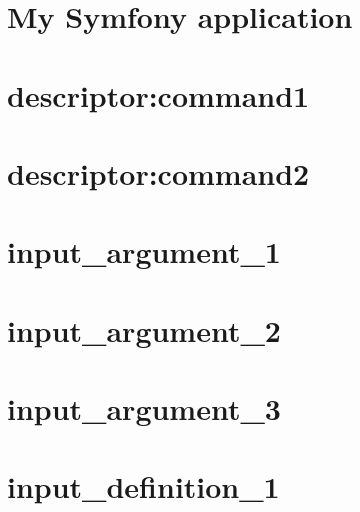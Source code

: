 \documentclass[twoside]{book}
\newcommand{\+}{\discretionary{\mbox{\scriptsize$\hookleftarrow$}}{}{}}
\begin{document}
\chapter{My Symfony application}
\label{md_vendor_symfony_console__symfony__component__console__tests__fixtures_application_2}

\chapter{descriptor\+:command1}
\label{md_vendor_symfony_console__symfony__component__console__tests__fixtures_command_1}

\chapter{descriptor\+:command2}
\label{md_vendor_symfony_console__symfony__component__console__tests__fixtures_command_2}

\chapter{input\+\_\+argument\+\_\+1}
\label{md_vendor_symfony_console__symfony__component__console__tests__fixtures_input_argument_1}

\chapter{input\+\_\+argument\+\_\+2}
\label{md_vendor_symfony_console__symfony__component__console__tests__fixtures_input_argument_2}

\chapter{input\+\_\+argument\+\_\+3}
\label{md_vendor_symfony_console__symfony__component__console__tests__fixtures_input_argument_3}

\chapter{input\+\_\+definition\+\_\+1}
\label{md_vendor_symfony_console__symfony__component__console__tests__fixtures_input_definition_1}

\end{document}
